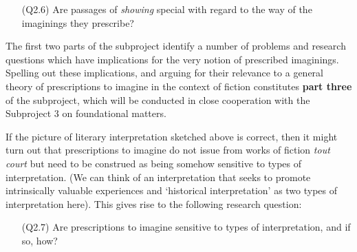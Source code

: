 \vspace{-.1cm}
\begin{itemize}[leftmargin=2cm]
\item[(Q2.6)] Are passages of \emph{showing} special with regard to the way of the imaginings they prescribe? 
\end{itemize}
\vspace{-.1cm}

\noindent The first two parts of the subproject identify a number of problems and research questions which have implications for the very notion of prescribed imaginings. Spelling out these implications, and arguing for their relevance to a general theory of prescriptions to imagine in the context of fiction constitutes \textbf{part three} of the subproject, which will be conducted in close cooperation with the Subproject 3 on foundational matters.

If the picture of literary interpretation sketched above is correct, then it might turn out that prescriptions to imagine do not issue from works of fiction \emph{tout court} but need to be construed as being somehow sensitive to types of interpretation. (We can think of an interpretation that seeks to promote intrinsically valuable experiences and `historical interpretation' as two types of interpretation here). This gives rise to the following research question:

\vspace{-.1cm}
\begin{itemize}[leftmargin=2cm]
\item[(Q2.7)] Are prescriptions to imagine sensitive to types of interpretation, and if so, how?
\end{itemize}
\vspace{-.1cm}

